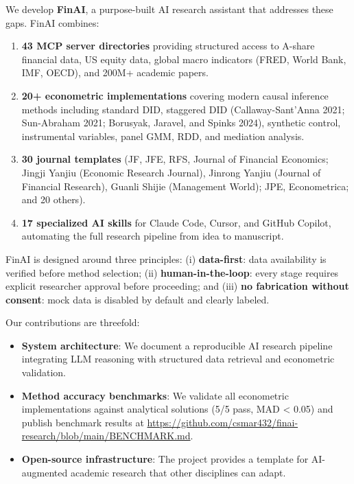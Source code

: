 \documentclass[12pt, a4paper]{article}
\begin{document}
We develop \textbf{FinAI}, a purpose-built AI research assistant that addresses these gaps. FinAI combines:

\begin{enumerate}
    \item \textbf{43 MCP server directories} providing structured access to A-share financial data, US equity data, global macro indicators (FRED, World Bank, IMF, OECD), and 200M+ academic papers.
    \item \textbf{20+ econometric implementations} covering modern causal inference methods including standard DID, staggered DID (Callaway-Sant'Anna 2021; Sun-Abraham 2021; Borusyak, Jaravel, and Spinks 2024), synthetic control, instrumental variables, panel GMM, RDD, and mediation analysis.
    \item \textbf{30 journal templates} (JF, JFE, RFS, Journal of Financial Economics; Jingji Yanjiu (Economic Research Journal), Jinrong Yanjiu (Journal of Financial Research), Guanli Shijie (Management World); JPE, Econometrica; and 20 others).
    \item \textbf{17 specialized AI skills} for Claude Code, Cursor, and GitHub Copilot, automating the full research pipeline from idea to manuscript.
\end{enumerate}

FinAI is designed around three principles: (i) \textbf{data-first}: data availability is verified before method selection; (ii) \textbf{human-in-the-loop}: every stage requires explicit researcher approval before proceeding; and (iii) \textbf{no fabrication without consent}: mock data is disabled by default and clearly labeled.

Our contributions are threefold:

\begin{itemize}
    \item \textbf{System architecture}: We document a reproducible AI research pipeline integrating LLM reasoning with structured data retrieval and econometric validation.
    \item \textbf{Method accuracy benchmarks}: We validate all econometric implementations against analytical solutions (5/5 pass, MAD < 0.05) and publish benchmark results at \url{https://github.com/csmar432/finai-research/blob/main/BENCHMARK.md}.
    \item \textbf{Open-source infrastructure}: The project provides a template for AI-augmented academic research that other disciplines can adapt.
\end{itemize}
\end{document}
